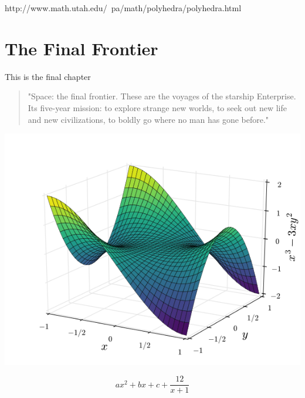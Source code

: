 \documentclass[openany,a4paper,12pt]{book}
\begin{document}
http://www.math.utah.edu/~pa/math/polyhedra/polyhedra.html
\chapter{The Final Frontier}
This is the final chapter
\begin{quotation}
"Space: \cite{greenwade93} the final frontier. These are the voyages of the starship Enterprise. Its five-year mission: to explore strange new worlds, to seek out new life and new civilizations, to boldly go where no man has gone before." \cite{AbedonHymanThomas03}
\end{quotation}
\begin{center}
\includegraphics[angle=0,scale=0.6]{picture4.png}
\end{center}

$$ax^2+bx+c+\dfrac{12}{x+1}$$
\end{document}
